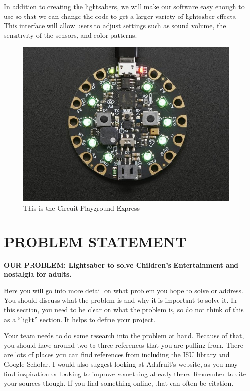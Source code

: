 \documentclass[12pt]{article}
\begin{document}
In addition to creating the lightsabers, we will make our software easy enough to use so that we can change the code to get a larger variety of lightsaber effects. This interface will allow users to adjust settings such as sound volume, the sensitivity of the sensors, and color patterns.


\begin{figure}[!t]
\centering
\includegraphics[width=4.5in]{cpx01.jpg}
\caption{This is the Circuit Playground Express}
\label{fig:cpx}
\end{figure}

\section{PROBLEM STATEMENT}

\bf{OUR PROBLEM:} Lightsaber to solve Children's Entertainment and nostalgia for adults.

Here you will go into more detail on what problem you hope to solve or address.  You should discuss what the problem is and why it is important to solve it. In this section, you need to be clear on what the problem is, so do not think of this as a ``light'' section. It helps to define your project.

Your team needs to do some research into the problem at hand. Because of that, you should have around two to three references that you are pulling from. There are lots of places you can find references from including the ISU library and Google Scholar. I would also suggest looking at Adafruit's website, as you may find inspiration or looking to improve something already there. Remember to cite your sources though. If you find something online, that can often be citation.
\end{document}
